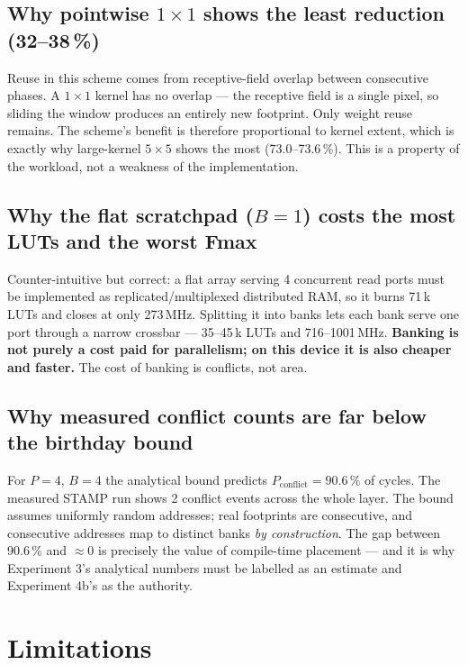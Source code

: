 \documentclass[11pt,a4paper]{article}
\begin{document}
\subsection{Why pointwise $1\times1$ shows the least reduction (32--38\,\%)}

Reuse in this scheme comes from receptive-field overlap between consecutive
phases. A $1\times1$ kernel has no overlap --- the receptive field is a single
pixel, so sliding the window produces an entirely new footprint. Only weight
reuse remains. The scheme's benefit is therefore proportional to kernel extent,
which is exactly why large-kernel $5\times5$ shows the most (73.0--73.6\,\%).
This is a property of the workload, not a weakness of the implementation.

\subsection{Why the flat scratchpad ($B{=}1$) costs the most LUTs and the worst Fmax}

Counter-intuitive but correct: a flat array serving 4 concurrent read ports must
be implemented as replicated/multiplexed distributed RAM, so it burns 71\,k LUTs
and closes at only 273\,MHz. Splitting it into banks lets each bank serve one
port through a narrow crossbar --- 35--45\,k LUTs and 716--1001\,MHz.
\textbf{Banking is not purely a cost paid for parallelism; on this device it is
also cheaper and faster.} The cost of banking is conflicts, not area.

\subsection{Why measured conflict counts are far below the birthday bound}

For $P{=}4$, $B{=}4$ the analytical bound predicts $P_{\text{conflict}} =
90.6\,\%$ of cycles. The measured STAMP run shows 2 conflict events across the
whole layer. The bound assumes uniformly random addresses; real footprints are
consecutive, and consecutive addresses map to distinct banks \emph{by
construction}. The gap between 90.6\,\% and $\approx$0 is precisely the value of
compile-time placement --- and it is why Experiment 3's analytical numbers must
be labelled as an estimate and Experiment 4b's as the authority.

\section{Limitations}
\end{document}
